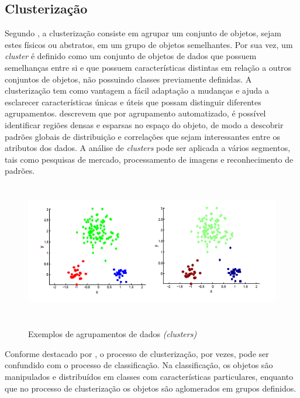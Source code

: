 \subsection{Clusterização} \label{3subtitle4}

Segundo \citet{han_kamber2006}, a clusterização consiste em agrupar um conjunto de objetos, sejam estes físicos ou abstratos, em um grupo de objetos semelhantes. Por sua vez, um \textit{cluster} é definido como um conjunto de objetos de dados que possuem semelhanças entre si e que possuem características distintas em relação a outros conjuntos de objetos, não possuindo classes previamente definidas. A clusterização tem como vantagem a fácil adaptação a mudanças e ajuda a esclarecer características únicas e úteis que possam distinguir diferentes agrupamentos. \citet{han_kamber2006} descrevem que por agrupamento automatizado, é possível identificar regiões densas e esparsas no espaço do objeto, de modo a descobrir padrões globais de distribuição e correlações que sejam interessantes entre os atributos dos dados. A análise de \textit{clusters} pode ser aplicada a vários segmentos, tais como pesquisas de mercado, processamento de imagens e reconhecimento de padrões.

\begin{figure}[!htb]
\centering
{\includegraphics[width=12cm,height=6cm]{images/cluster}}
\caption {Exemplos de agrupamentos de dados \textit{(clusters)}}
\label{cluster}
\end{figure}

Conforme  destacado por \citet{dantas2014}, o processo de clusterização, por vezes, pode ser confundido com o processo de classificação. Na classificação, os objetos são manipulados e distribuídos em classes com características particulares, enquanto que no processo de clusterização os objetos são aglomerados em grupos definidos.

